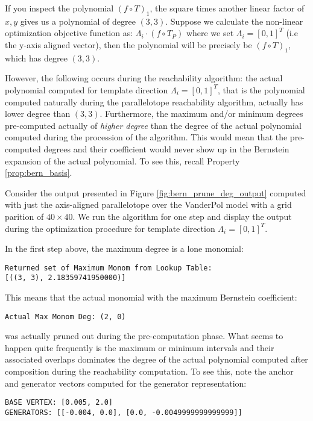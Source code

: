 If you inspect the polynomial $(f \circ T)_1$, the square times another linear factor of $x,y$ gives us a polynomial of degree $(3,3)$.
%
Suppose we calculate the non-linear optimization objective function as: $\Lambda_i \cdot (f \circ T_P)$ where we set $\Lambda_i = [0,1]^T$ (i.e the y-axis aligned vector), then the polynomial will be precisely be $(f \circ T)_1$, which has degree $(3,3)$.

However, the following occurs during the reachability algorithm: the actual polynomial computed for template direction $\Lambda_i =[0,1]^T$, that is the polynomial computed naturally during the parallelotope reachability algorithm, actually has lower degree than $(3,3)$.
%
Furthermore, the maximum and/or minimum degrees pre-computed actually of \emph{higher degree} than the degree of the actual polynomial computed during the procession of the algorithm. This would mean that the pre-computed degrees and their coefficient would never show up in the Bernstein expansion of the actual polynomial. To see this, recall Property \ref{prop:bern_basis}.

Consider the output presented in Figure \ref{fig:bern_prune_deg_output} computed with just the axis-aligned parallelotope over the VanderPol model with a grid parition of $40 \times 40$. We run the algorithm for one step and display the output during the optimization procedure for template direction $\Lambda_i = [0,1]^T$.

In the first step above, the maximum degree is a lone monomial:
%
\begin{verbatim}
Returned set of Maximum Monom from Lookup Table:
[((3, 3), 2.18359741950000)]
\end{verbatim}
%
This means that the actual monomial with the maximum Bernstein coefficient:
\begin{verbatim}
Actual Max Monom Deg: (2, 0)
\end{verbatim}
%
was actually pruned out during the pre-computation phase.
%
What seems to happen quite frequently is the maximum or minimum intervals and their associated overlaps dominates the degree of the actual polynomial computed after composition during the reachability computation. To see this, note the anchor and generator vectors computed for the generator representation:
%
\begin{verbatim}
BASE VERTEX: [0.005, 2.0]
GENERATORS: [[-0.004, 0.0], [0.0, -0.0049999999999999]]
\end{verbatim}


